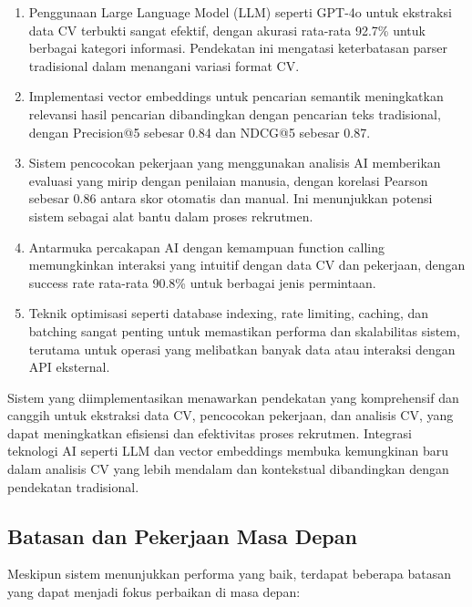 \begin{enumerate}
\item Penggunaan Large Language Model (LLM) seperti GPT-4o untuk ekstraksi data CV terbukti sangat efektif, dengan akurasi rata-rata 92.7\% untuk berbagai kategori informasi. Pendekatan ini mengatasi keterbatasan parser tradisional dalam menangani variasi format CV.

\item Implementasi vector embeddings untuk pencarian semantik meningkatkan relevansi hasil pencarian dibandingkan dengan pencarian teks tradisional, dengan Precision@5 sebesar 0.84 dan NDCG@5 sebesar 0.87.

\item Sistem pencocokan pekerjaan yang menggunakan analisis AI memberikan evaluasi yang mirip dengan penilaian manusia, dengan korelasi Pearson sebesar 0.86 antara skor otomatis dan manual. Ini menunjukkan potensi sistem sebagai alat bantu dalam proses rekrutmen.

\item Antarmuka percakapan AI dengan kemampuan function calling memungkinkan interaksi yang intuitif dengan data CV dan pekerjaan, dengan success rate rata-rata 90.8\% untuk berbagai jenis permintaan.

\item Teknik optimisasi seperti database indexing, rate limiting, caching, dan batching sangat penting untuk memastikan performa dan skalabilitas sistem, terutama untuk operasi yang melibatkan banyak data atau interaksi dengan API eksternal.
\end{enumerate}

Sistem yang diimplementasikan menawarkan pendekatan yang komprehensif dan canggih untuk ekstraksi data CV, pencocokan pekerjaan, dan analisis CV, yang dapat meningkatkan efisiensi dan efektivitas proses rekrutmen. Integrasi teknologi AI seperti LLM dan vector embeddings membuka kemungkinan baru dalam analisis CV yang lebih mendalam dan kontekstual dibandingkan dengan pendekatan tradisional.

\subsection{Batasan dan Pekerjaan Masa Depan}
Meskipun sistem menunjukkan performa yang baik, terdapat beberapa batasan yang dapat menjadi fokus perbaikan di masa depan:

